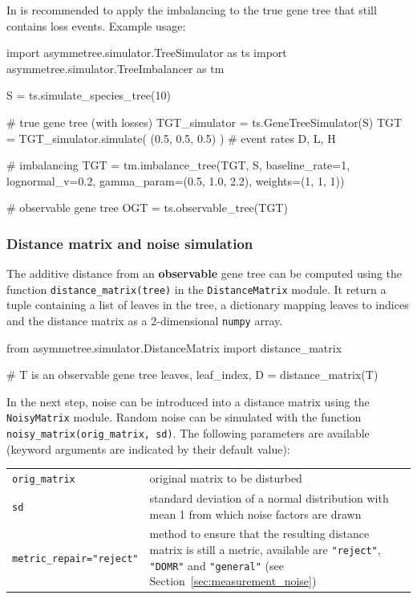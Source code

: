 \documentclass[hidelinks,11pt]{scrreprt}
\begin{document}
In is recommended to apply the imbalancing to the true gene tree that still contains loss events.
Example usage:
\vspace{2mm}
\begin{python}
import asymmetree.simulator.TreeSimulator as ts
import asymmetree.simulator.TreeImbalancer as tm

S = ts.simulate_species_tree(10)

# true gene tree (with losses)
TGT_simulator = ts.GeneTreeSimulator(S)
TGT = TGT_simulator.simulate( (0.5, 0.5, 0.5) )    # event rates D, L, H

# imbalancing
TGT = tm.imbalance_tree(TGT, S, baseline_rate=1,
                        lognormal_v=0.2,
                        gamma_param=(0.5, 1.0, 2.2),
                        weights=(1, 1, 1))

# observable gene tree
OGT = ts.observable_tree(TGT)
\end{python}
\vspace{2mm}


\subsubsection{Distance matrix and noise simulation}

The additive distance from an \textbf{observable} gene tree can be computed using the function \texttt{distance\_matrix(tree)} in the \texttt{DistanceMatrix} module.
It return a tuple containing a list of leaves in the tree, a dictionary mapping leaves to indices and the distance matrix as a 2-dimensional \texttt{numpy} array.

\vspace{2mm}
\begin{python}
from asymmetree.simulator.DistanceMatrix import distance_matrix

# T is an observable gene tree
leaves, leaf_index, D = distance_matrix(T)
\end{python}
\vspace{2mm}

In the next step, noise can be introduced into a distance matrix using the \texttt{NoisyMatrix} module.
Random noise can be simulated with the function \texttt{noisy\_matrix(orig\_matrix, sd)}.
The following parameters are available (keyword arguments are indicated by their default value):

\vspace{3mm}
\renewcommand{\arraystretch}{1.5}
\begin{tabularx}{0.95\textwidth} { >{\raggedright\arraybackslash}p{4.5cm} >{\raggedright\arraybackslash}X }
	\texttt{orig\_matrix} & original matrix to be disturbed\\
	\texttt{sd}  & standard deviation of a normal distribution with mean 1 from which noise factors are drawn\\
	\texttt{metric\_repair="reject"}  & method to ensure that the resulting distance matrix is still a metric, available are \texttt{"reject"}, \texttt{"DOMR"} and \texttt{"general"} (see Section~\ref{sec:measurement_noise})\\
\end{tabularx}
\vspace{3mm}
\end{document}
